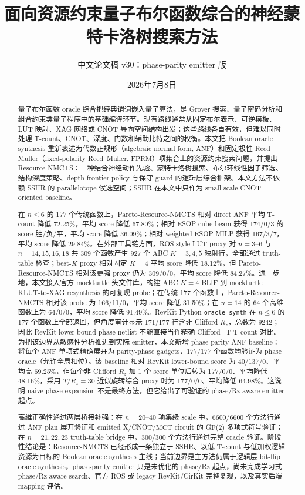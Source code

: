\documentclass[UTF8,fontset=macnew,11pt]{ctexart}
\title{面向资源约束量子布尔函数综合的神经蒙特卡洛树搜索方法}
\author{中文论文稿 v30：phase-parity emitter 版}
\date{2026年7月8日}
\newcommand{\method}{Resource-NMCTS}
\newcommand{\anf}{\ensuremath{\mathrm{ANF}}}
\newcommand{\fprm}{\ensuremath{\mathrm{FPRM}}}
\newcommand{\mct}{\ensuremath{\mathrm{MCT}}}
\newcommand{\rz}{\ensuremath{R_z}}
\newcommand{\ttable}{truth-table}
\begin{document}
\pagestyle{plain}
\maketitle

\begin{abstract}
量子布尔函数 oracle 综合把经典谓词嵌入量子算法，是 Grover 搜索、量子密码分析和组合约束类量子程序中的基础编译环节。现有路线通常从固定布尔表示、可逆模板、LUT 映射、XAG 网络或 CNOT 导向空间结构出发；这些路线各自有效，但难以同时处理 T-count、CNOT、深度、门数和辅助比特之间的权衡。本文把 Boolean oracle synthesis 重新表述为代数正规形（algebraic normal form, \anf{}）和固定极性 Reed--Muller（fixed-polarity Reed--Muller, \fprm{}）项集合上的资源约束搜索问题，并提出 \method{}：一种结合神经动作先验、蒙特卡洛树搜索、布尔环线性因子筛选、结构深度策略、depth-frontier policy 与保守 guard 的逻辑层综合框架。本文方法不依赖 SSHR 的 parallelotope 候选空间；SSHR 在本文中只作为 small-scale CNOT-oriented baseline。

在 $n\leq6$ 的 177 个传统函数上，Pareto-\method{} 相对 direct \anf{} 平均 T-count 降低 72.25\%，平均 score 降低 67.80\%；相对 ESOP cube beam 获得 174/0/3 的 score 胜/负/平，平均 score 降低 36.09\%；相对 weighted ESOP-MILP 获得 167/3/7，平均 score 降低 29.84\%。在外部工具链方面，ROS-style LUT proxy 对 $n=3$--$6$ 与 $n=14,15,16,18$ 共 309 个函数产生 927 个 ABC $K=3,4,5$ 映射行，全部通过 \ttable{} 检查；best-$K$ proxy 相对固定 $K=4$ 平均 score 降低 18.12\%，但 Pareto-\method{} 相对该更强 proxy 仍为 309/0/0，平均 score 降低 84.27\%。进一步地，本文接入官方 mockturtle 头文件库，构建 ABC $K=4$ BLIF 到 mockturtle KLUT-to-XAG resynthesis 的可复现 probe；在传统 177 个函数上，Pareto-\method{} 相对该 probe 为 166/11/0，平均 score 降低 31.50\%；在 $n=14$ 的 64 个高维函数上为 64/0/0，平均 score 降低 91.49\%。RevKit Python \texttt{oracle\_synth} 在 $n\leq6$ 的 177 个函数上全部返回，但角度审计显示 171/177 行含非 Clifford \rz{}，总数为 9242；因此 RevKit lower-bound phase netlist 不能直接当作精确 Clifford+T T-count 对比。为把该边界从敏感性分析推进到实际 emitter，本文新增 phase-parity \anf{} baseline：将每个 \anf{} 单项式精确展开为 parity-phase gadgets，177/177 个函数均验证为 phase oracle（允许全局相位）。该 baseline 相对 RevKit lower-bound score 为 40/137/0、平均高 69.25\%，但每个非 Clifford \rz{} 加 1 个 score 单位后转为 177/0/0、平均降低 48.16\%，采用 $T/R_z=30$ 近似旋转综合 proxy 时为 177/0/0、平均降低 64.98\%。这说明 naive phase expansion 不是最终方法，但它给出了可验证的 phase/Rz-aware emitter 起点。

高维正确性通过两层桥接补强：在 $n=20$--$40$ 项集级 scale 中，6600/6600 个方法行通过 \anf{} plan 展开验证和 emitted X/CNOT/\mct{} circuit 的 GF(2) 多项式符号验证；在 $n=21,22,23$ truth-table bridge 中，300/300 个方法行通过完整 oracle 验证。阶段性结论是：\method{} 已经形成一条独立于 SSHR、以低 T-count 与低加权逻辑资源为目标的 Boolean oracle synthesis 主线；当前边界是主方法仍属于逻辑层 bit-flip oracle synthesis，phase-parity emitter 只是未优化的 phase/Rz 起点，尚未完成学习式 phase/Rz-aware search、官方 ROS 或 legacy RevKit/CirKit 完整复现，以及真实后端 mapping 评估。
\end{abstract}
\end{document}
